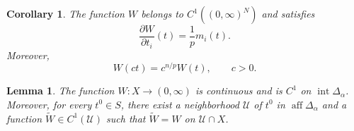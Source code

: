 \documentclass[10pt,a4paper]{amsart}
\newtheorem{corollary}{Corollary}
\newtheorem{lemma}{Lemma}
\begin{document}
\begin{corollary}\label{cor:inverse-volume-derivative}
The function $W$ belongs to $C^1((0,\infty)^N)$ and satisfies
\begin{equation}\label{eq:inverse-volume-derivative}
 \frac{\partial W}{\partial t_i}(t)=\frac1p m_i(t).
\end{equation}
Moreover,
\begin{equation}\label{eq:inverse-volume-homogeneity}
 W(ct)=c^{n/p}W(t),
 \qquad c>0.
\end{equation}
\end{corollary}

\begin{lemma}\label{lem:W-regularity}
	The function \(W:X\to(0,\infty)\) is continuous and is
	\(C^1\) on \(\operatorname{int}\Delta_\alpha\). Moreover, for every
	\(t^0\in S\), there exist a neighborhood \(\mathcal U\) of \(t^0\)
	in \(\operatorname{aff}\Delta_\alpha\) and a function
	\(\widetilde W\in C^1(\mathcal U)\) such that
	\(
	\widetilde W=W\)
	on \(\mathcal U\cap X
	\).
\end{lemma}
\end{document}
